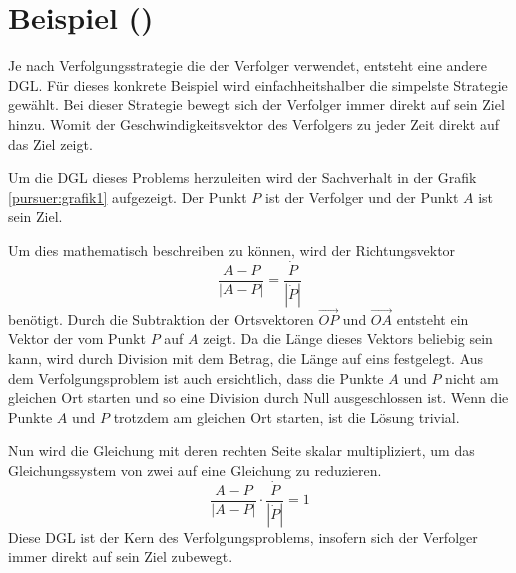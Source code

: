 %
%
%
\section{Beispiel ()
\label{lambertw:section:teil1}}






Je nach Verfolgungsstrategie die der Verfolger verwendet, entsteht eine andere DGL.
Für dieses konkrete Beispiel wird einfachheitshalber die simpelste Strategie gewählt.
Bei dieser Strategie bewegt sich der Verfolger immer direkt auf sein Ziel hinzu.
Womit der Geschwindigkeitsvektor des Verfolgers zu jeder Zeit direkt auf das Ziel zeigt.

Um die DGL dieses Problems herzuleiten wird der Sachverhalt in der Grafik \eqref{pursuer:grafik1} aufgezeigt.
Der Punkt $P$ ist der Verfolger und der Punkt $A$ ist sein Ziel.

Um dies mathematisch beschreiben zu können, wird der Richtungsvektor
\begin{equation}
    \frac{A-P}{|A-P|}
    =
    \frac{\dot{P}}{|\dot{P}|}
\end{equation}
benötigt. Durch die Subtraktion der Ortsvektoren $\overrightarrow{OP}$ und $\overrightarrow{OA}$ entsteht ein Vektor der vom Punkt $P$ auf $A$ zeigt.
Da die Länge dieses Vektors beliebig sein kann, wird durch Division mit dem Betrag, die Länge auf eins festgelegt.
Aus dem Verfolgungsproblem ist auch ersichtlich, dass die Punkte $A$ und $P$ nicht am gleichen Ort starten und so eine Division durch Null ausgeschlossen ist.
Wenn die Punkte $A$ und $P$ trotzdem am gleichen Ort starten, ist die Lösung trivial.

Nun wird die Gleichung mit deren rechten Seite skalar multipliziert, um das Gleichungssystem von zwei auf eine Gleichung zu reduzieren.
\begin{equation}
    \label{pursuer:pursuerDGL}
    \frac{A-P}{|A-P|}\cdot \frac{\dot{P}}{|\dot{P}|}
    =
    1
\end{equation}
Diese DGL ist der Kern des Verfolgungsproblems, insofern sich der Verfolger immer direkt auf sein Ziel zubewegt.


